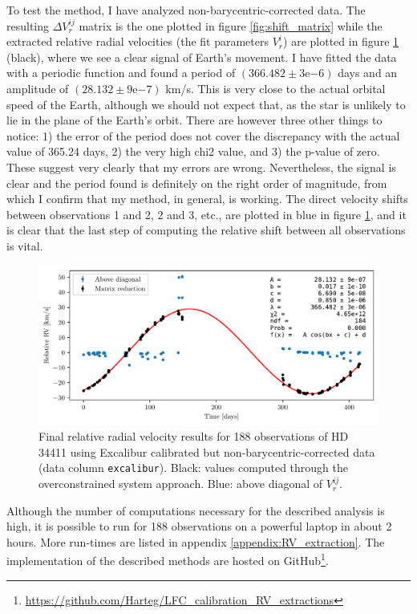     To test the method, I have analyzed non-barycentric-corrected data. The resulting $\Delta V_r^{ij}$ matrix is the one plotted in figure \ref{fig:shift_matrix} while the extracted relative radial velocities (the fit parameters $V_r^i$) are plotted in figure \ref{fig:RV_results_non_barycentric} (black), where we see a clear signal of Earth's movement. I have fitted the data with a periodic function and found a  period of $(366.482 \pm 3\mathrm{e}{-6})$ days and an amplitude of $(28.132 \pm 9\mathrm{e}{-7})$ km/s. This is very close to the actual orbital speed of the Earth, although we should not expect that, as the star is unlikely to lie in the plane of the Earth's orbit. There are however three other things to notice: 1) the error of the period does not cover the discrepancy with the actual value of 365.24 days, 2) the very high chi2 value, and 3) the p-value of zero. These suggest very clearly that my errors are wrong. Nevertheless, the signal is clear and the period found is definitely on the right order of magnitude, from which I confirm that my method, in general, is working. The direct velocity shifts between observations 1 and 2, 2 and 3, etc.,  are plotted in blue in figure \ref{fig:RV_results_non_barycentric}, and it is clear that the last step of computing the relative shift between all observations is vital.

    \begin{figure}%
        \begin{wide}  
            \includegraphics[width=\textwidth]{figures/shift_non_bary_centric.pdf}
            \caption{Final relative radial velocity results for 188 observations of HD 34411 using Excalibur calibrated but non-barycentric-corrected data (data column \texttt{excalibur}). Black: values computed through the overconstrained system approach. Blue: above diagonal of $V_r^{ij}$.}
            \label{fig:RV_results_non_barycentric}
        \end{wide}
    \end{figure}


    Although the number of computations necessary for the described analysis is high, it is possible to run for 188 observations on a powerful laptop in about 2 hours. More run-times are listed in appendix \ref{appendix:RV_extraction}. The implementation of the described methods are hosted on GitHub\footnote{\url{https://github.com/Harteg/LFC_calibration_RV_extractions}}. 

    
    


